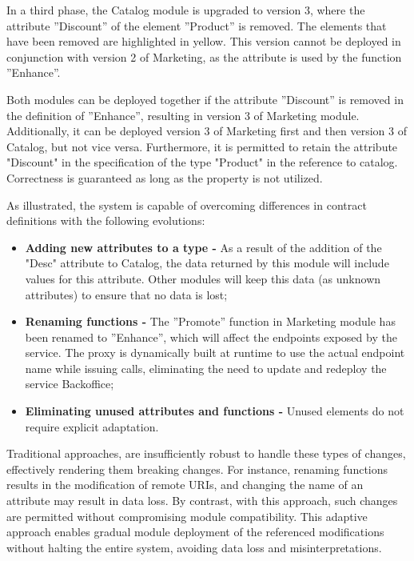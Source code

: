 In a third phase, the Catalog module is upgraded to version 3, where the attribute ''Discount'' of the element ''Product'' is removed.
The elements that have been removed are highlighted in yellow.
This version cannot be deployed in conjunction with version 2 of Marketing, as the attribute is used by the function ''Enhance''.

Both modules can be deployed together if the attribute ''Discount'' is removed in the definition of ''Enhance'', resulting in version 3 of Marketing module.
Additionally, it can be deployed version 3 of Marketing first and then version 3 of Catalog, but not vice versa.
Furthermore, it is permitted to retain the attribute "Discount" in the specification of the type "Product" in the reference to catalog.
Correctness is guaranteed as long as the property is not utilized.

As illustrated,
the system is capable of overcoming differences in contract definitions with the following evolutions:

\begin{itemize}
    \item \textbf{Adding new attributes to a type -} As a result of the addition of the "Desc" attribute to Catalog, the data returned by this module will include values for this attribute.
    Other modules will keep this data (as unknown attributes) to ensure that no data is lost;
    \item \textbf{Renaming functions -} The ''Promote'' function in Marketing module has been renamed to ''Enhance'', which will affect the endpoints exposed by the service.
    The proxy is dynamically built at runtime to use the actual endpoint name while issuing calls, eliminating the need to update and redeploy the service Backoffice;
    \item \textbf{Eliminating unused attributes and functions -} Unused elements do not require explicit adaptation.
\end{itemize}

Traditional approaches, are insufficiently robust to handle these types of changes, effectively rendering them breaking changes.
For instance, renaming functions results in the modification of remote URIs, and changing the name of an attribute may result in data loss.
By contrast, with this approach, such changes are permitted without compromising module compatibility.
This adaptive approach enables gradual module deployment of the referenced modifications without halting the entire system, avoiding data loss and misinterpretations.

